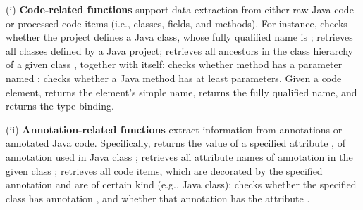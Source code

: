 (i) \textbf{Code-related functions} support data extraction from either raw Java code or processed code items (i.e., classes, fields, and methods). For instance,  checks whether the project defines a Java class, whose fully qualified name is ; 
 retrieves all classes defined by a Java project; 
 retrieves all ancestors in the class hierarchy of a given class , together with  itself; 
 checks whether method  has a parameter named ; 
 checks whether 
a Java method has at least  parameters. 
Given a code element,   returns the element's simple name,  returns the fully qualified name, and   returns the type binding. 

(ii) \textbf{Annotation-related functions} extract information from annotations or annotated Java code. Specifically,  returns the value of a specified attribute , of annotation  used in Java class ; 
 retrieves all attribute names of annotation  in the given class ; 
 retrieves all code items, which are decorated by the specified annotation and are of certain kind (e.g., Java class);
 checks whether the specified class has annotation , and whether that annotation has the attribute . 


